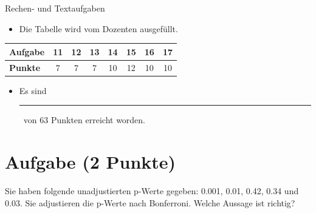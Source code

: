 \documentclass[a4paper, 10pt]{scrartcl}\usepackage[]{graphicx}\usepackage[]{xcolor}
\begin{document}
\begin{graybox}{Rechen- und Textaufgaben}
  \begin{itemize}
  \item Die Tabelle wird vom Dozenten ausgef{\"u}llt.
  \end{itemize}
  \begin{center}
    \large
    \begin{tabular}{|l|c|c|c|c|c|c|c|}
      \hline
      \textbf{Aufgabe} & 11 & 12 & 13 & 14 & 15 & 16 & 17 \strut\\
      \hline
      \textbf{Punkte} & 
      \hspace{1Ex}\Large\textcolor{gray!70}{7}\hspace{1Ex}  & 
      \hspace{1Ex}\Large\textcolor{gray!70}{7}\hspace{1Ex}  & 
      \hspace{1Ex}\Large\textcolor{gray!70}{7}\hspace{1Ex}  & 
      \hspace{1Ex}\Large\textcolor{gray!70}{10}\hspace{1Ex}  & 
      \hspace{1Ex}\Large\textcolor{gray!70}{12}\hspace{1Ex}  & 
      \hspace{1Ex}\Large\textcolor{gray!70}{10}\hspace{1Ex}  & 
      \hspace{1Ex}\Large\textcolor{gray!70}{10}\hspace{1Ex} \strut\\
      \hline
  \end{tabular}
\end{center}
\begin{itemize}
\item Es sind \rule[0ex]{2em}{.4pt}\, von 63 Punkten erreicht worden.
\end{itemize}
\end{graybox}

\clearpage

\section{Aufgabe \hfill (2 Punkte)}



Sie haben folgende unadjustierten p-Werte gegeben: 0.001, 0.01, 0.42, 0.34 und 0.03. Sie adjustieren die p-Werte nach
Bonferroni. Welche Aussage ist richtig?
\end{document}
